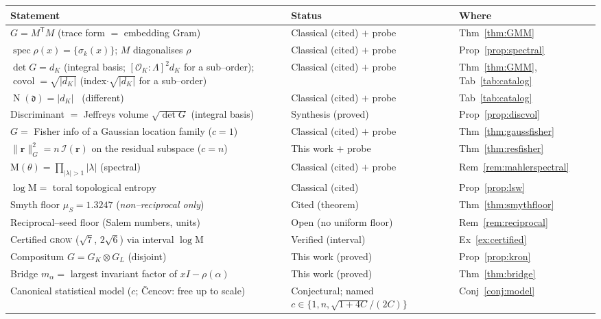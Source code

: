 \documentclass[11pt]{article}
\theoremstyle{plain}
\theoremstyle{definition}
\theoremstyle{remark}
\newcommand{\K}{K}
\newcommand{\OK}{\mathcal{O}_K}
\newcommand{\Nm}{\operatorname{N}}
\newcommand{\Mah}{\mathrm{M}}
\newcommand{\Fish}{\mathcal{I}}
\newcommand{\rr}{\mathbf{r}}
\newcommand{\GG}{G}
\newcommand{\transpose}{^{\mathsf{T}}}
\begin{document}
\begin{table}[ht]
\centering
\footnotesize
\begin{tabular}{p{} l l}
\toprule
Statement & Status & Where \\
\midrule
$\GG=M\transpose M$ (trace form $=$ embedding Gram) & Classical (cited) $+$ probe & Thm~\ref{thm:GMM} \\
$\operatorname{spec}\rho(x)=\{\sigma_k(x)\}$; $M$ diagonalises $\rho$ & Classical (cited) $+$ probe & Prop~\ref{prop:spectral} \\
$\det\GG=d_\K$ (integral basis; $[\OK\!:\!\Lambda]^2 d_\K$ for a sub--order); $\operatorname{covol}=\sqrt{|d_\K|}$ (index$\cdot\sqrt{|d_\K|}$ for a sub--order) & Classical (cited) $+$ probe & Thm~\ref{thm:GMM}, Tab~\ref{tab:catalog} \\
$\Nm(\mathfrak d)=|d_\K|$ \ (different) & Classical (cited) $+$ probe & Tab~\ref{tab:catalog} \\
Discriminant $=$ Jeffreys volume $\sqrt{\det\GG}$ (integral basis) & Synthesis (proved) & Prop~\ref{prop:discvol} \\
$\GG=$ Fisher info of a Gaussian location family ($c=1$) & Classical (cited) $+$ probe & Thm~\ref{thm:gaussfisher} \\
$\lVert\rr\rVert_{\GG}^2=n\,\Fish(\rr)$ on the residual subspace ($c=n$) & This work $+$ probe & Thm~\ref{thm:resfisher} \\
$\Mah(\theta)=\prod_{|\lambda|>1}|\lambda|$ (spectral) & Classical (cited) $+$ probe & Rem~\ref{rem:mahlerspectral} \\
$\log\Mah=$ toral topological entropy & Classical (cited) & Prop~\ref{prop:lsw} \\
Smyth floor $\mu_S=1.3247$ (\emph{non--reciprocal only}) & Cited (theorem) & Thm~\ref{thm:smythfloor} \\
Reciprocal--seed floor (Salem numbers, units) & Open (no uniform floor) & Rem~\ref{rem:reciprocal} \\
Certified \textsc{grow} ($\sqrt7$, $2\sqrt6$) via interval $\log\Mah$ & Verified (interval) & Ex~\ref{ex:certified} \\
Compositum $\GG=\GG_\K\otimes\GG_L$ (disjoint) & This work (proved) & Prop~\ref{prop:kron} \\
Bridge $m_\alpha=$ largest invariant factor of $xI-\rho(\alpha)$ & This work (proved) & Thm~\ref{thm:bridge} \\
Canonical statistical model ($c$; \v{C}encov: free up to scale) & Conjectural; named $c\in\{1,n,\sqrt{1+4C}/(2C)\}$ & Conj~\ref{conj:model} \\

\end{tabular}
\end{table}
\end{document}
